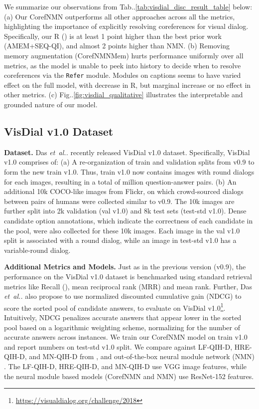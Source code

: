 \documentclass[runningheads]{llncs}
\makeatletter
\DeclareRobustCommand\onedot{\futurelet\@let@token\@onedot}
\def\@onedot{\ifx\@let@token.\else.\null\fi\xspace}
\def\etal{\textit{et~al\onedot}} \def\iid{i.i.d\onedot}
\def\Fig{Fig\onedot}
\def\Table{Tab\onedot}
\newcommand{\nmn}{CorefNMN\xspace}
\newcommand{\myparagraph}[1]{\vspace{0pt}\noindent{\bf #1}}
\makeatother
\begin{document}
\myparagraph{Results.}
We summarize our observations from \Table\ref{tab:visdial_disc_result_table} below:
(a) Our \nmn outperforms all other approaches across all the metrics, 
	highlighting the importance of explicitly resolving coreferences for visual
	dialog.
  	Specifically, our R () is at least 1 point higher than the 	
     best prior work (AMEM+SEQ-QI), and almost 2 points higher than NMN.
(b) Removing memory augmentation (\nmn{}Mem) hurts performance 
	uniformly over all metrics, as the model is unable to peek into 
    history to decide when to resolve coreferences via the \texttt{Refer} 
    module.
	Modules on captions seems to have varied effect on the full model, with
    decrease in R, but marginal increase or no effect in other metrics.
(c) \Fig\ref{fig:visdial_qualitative} illustrates the interpretable and 	
    grounded nature of our model.


\subsection{VisDial v1.0 Dataset}
\textbf{Dataset.}
Das \etal \cite{visdial} recently released VisDial v1.0 dataset.
Specifically, VisDial v1.0 comprises of:
(a) A re-organization of train and validation splits from v0.9 to form the new train v1.0.
Thus, train v1.0 now contains  images with round dialogs for each images, resulting
in a total of  million question-answer pairs.
(b) An additional 10k COCO-like images from Flickr, on which crowd-sourced dialogs between
pairs of humans were collected similar to v0.9.
The 10k images are further split into 2k validation (val v1.0) and 8k test sets (test-std v1.0).
Dense candidate option annotations, which indicate the correctness 
of each candidate in the pool, were also collected for these 10k images.
Each image in the val v1.0 split is associated with a round dialog, 
while an image in test-std v1.0 has a variable-round dialog.


\noindent
\textbf{Additional Metrics and Models.}
Just as in the previous version (v0.9), the performance on the VisDial v1.0 dataset 
is benchmarked using standard retrieval metrics like Recall (),
mean reciprocal rank (MRR) and mean rank.
Further, Das \etal \cite{visdial} also propose to use normalized 
discounted cumulative gain (NDCG) to score the sorted pool of candidate
answers,
to evaluate on VisDial v1.0\footnote{\url{https://visualdialog.org/challenge/2018}}.
Intuitively, NDCG penalizes accurate answers that appear lower in the 
sorted pool based on a logarithmic weighting scheme, normalizing for 
the number of accurate answers across instances.
We train our \nmn{} model on train v1.0 and report numbers on test-std v1.0 split.
We compare against LF-QIH-D, HRE-QIH-D, and MN-QIH-D from \cite{visdial}, and
out-of-the-box neural module network (NMN) \cite{hu2017learning}.
The LF-QIH-D, HRE-QIH-D, and MN-QIH-D use VGG \cite{simonyan_iclr15} 
image features, while the neural module based models (\nmn{} and NMN) 
use ResNet-152 \cite{he16cvpr} features.
\end{document}
